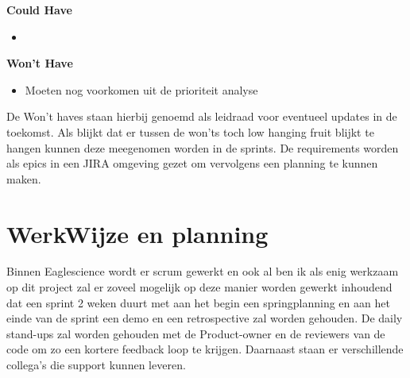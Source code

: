 \textbf{Could Have}
\begin{itemize}
\item
\end{itemize}

\textbf{Won't Have}
\begin{itemize}
  \item Moeten nog voorkomen uit de prioriteit analyse
\end{itemize}
De Won't haves staan hierbij genoemd als leidraad voor eventueel updates in de toekomst.
Als blijkt dat er tussen de won'ts toch low hanging fruit blijkt te hangen kunnen deze meegenomen worden in de sprints.
De requirements worden als epics in een JIRA omgeving gezet om vervolgens een planning te kunnen maken.


\section{WerkWijze en planning}\label{sec:werkwijze-en-planning}
Binnen Eaglescience wordt er scrum gewerkt en ook al ben ik als enig werkzaam op dit project zal er zoveel mogelijk op deze manier worden gewerkt inhoudend dat een sprint 2 weken duurt met aan het begin een springplanning en aan het einde van de sprint een demo en een retrospective zal worden gehouden.
De daily stand-ups zal worden gehouden met de Product-owner en de reviewers van de code om zo een kortere feedback loop te krijgen.
Daarnaast staan er verschillende collega's die support kunnen leveren.
